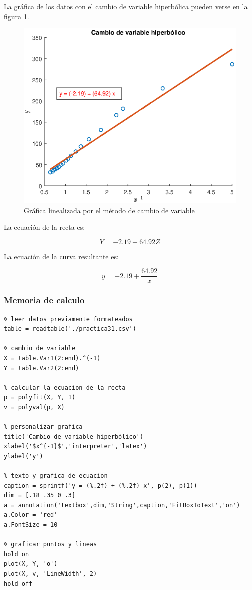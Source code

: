 \documentclass[letter,11pt]{article}
\begin{document}
La gráfica de los datos con el cambio de variable hiperbólica pueden verse en la
figura \ref{practica31_3}.

\begin{figure}[!h]
\centering
\includegraphics[scale=1.00]{eps/practica31_3.eps}
\caption{Gráfica linealizada por el método de cambio de variable}
\label{practica31_3}
\end{figure}

La ecuación de la recta es:

\begin{equation}
    Y = -2.19 + 64.92 Z
\end{equation}

La ecuación de la curva resultante es:

\begin{equation}
    y = -2.19 + \frac{64.92}{x}
\end{equation}

\subsubsection{Memoria de calculo}

\footnotesize
\begin{verbatim}
% leer datos previamente formateados
table = readtable('./practica31.csv')

% cambio de variable
X = table.Var1(2:end).^(-1)
Y = table.Var2(2:end)

% calcular la ecuacion de la recta
p = polyfit(X, Y, 1)
v = polyval(p, X)

% personalizar grafica
title('Cambio de variable hiperbólico')
xlabel('$x^{-1}$','interpreter','latex')
ylabel('y')

% texto y grafica de ecuacion
caption = sprintf('y = (%.2f) + (%.2f) x', p(2), p(1))
dim = [.18 .35 0 .3]
a = annotation('textbox',dim,'String',caption,'FitBoxToText','on')
a.Color = 'red'
a.FontSize = 10

% graficar puntos y lineas
hold on
plot(X, Y, 'o')
plot(X, v, 'LineWidth', 2)
hold off
\end{verbatim}
\normalsize
\end{document}
